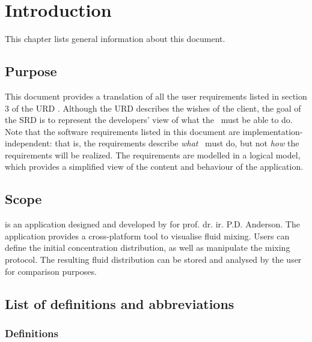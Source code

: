 \chapter{Introduction}
This chapter lists general information about this document.

\section{Purpose}
This document provides a translation of all the user requirements listed in section 3 of the URD \cite{urd}. Although the URD describes the wishes of the client, the goal of the SRD is to represent the developers' view of what the \applicationname\ must be able to do. \\
Note that the software requirements listed in this document are implementation-independent: that is, the requirements describe \emph{what} \projectname\ must do, but not \emph{how} the requirements will be realized. The requirements are modelled in a logical model, which provides a simplified view of the content and behaviour of the application.

\section{Scope}
\projectname{} is an application designed and developed by \projectauthor{} for prof. dr. ir. P.D. Anderson. The application provides a cross-platform tool to visualise fluid mixing. Users can define the initial concentration distribution, as well as manipulate the mixing protocol. The resulting fluid distribution can be stored and analysed by the user for comparison purposes. \\

\section{List of definitions and abbreviations}

\subsection{Definitions}


